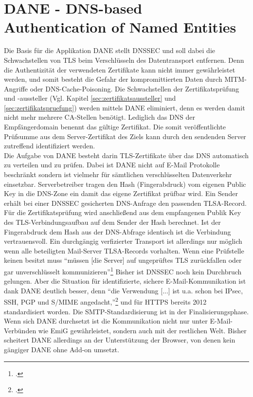 \section{DANE - DNS-based Authentication of Named Entities}
\label{sec:dane}
	Die Basis für die Applikation \ac{DANE} stellt \ac{DNSSEC} und soll dabei die Schwachstellen von \ac{TLS} beim Verschlüsseln des Datentransport entfernen. Denn die Authentizität der verwendeten Zertifikate kann nicht immer gewährleistet werden, und somit besteht die Gefahr der kompromittierten Daten durch \ac{MITM}-Angriffe oder \ac{DNS}-Cache-Poisoning.
	Die Schwachstellen der Zertifikatsprüfung und -aussteller (Vgl. Kapitel \ref{sec:zertifikatsaussteller} und \ref{sec:zertifikatspruefung}) werden mittels \ac{DANE} eliminiert, denn es werden damit nicht mehr mehrere CA-Stellen benötigt. Lediglich das DNS der Empfängerdomain benennt das gültige Zertifikat. Die somit  veröffentlichte Prüfsumme aus dem Server-Zertifikat des Ziels kann durch den sendenden Server zutreffend identifiziert werden.\medskip\\
	Die Aufgabe von \ac{DANE} besteht darin \ac{TLS}-Zertifikate über das \ac{DNS} automatisch zu verteilen und zu prüfen. Dabei ist \ac{DANE} nicht auf E-Mail Protokolle beschränkt sondern ist vielmehr für sämtlichen verschlüsselten Datenverkehr einsetzbar.
	Serverbetreiber tragen den Hash (Fingerabdruck) vom eigenen Public Key in die \ac{DNS}-Zone ein damit das eigene Zertifikat prüfbar wird. Ein Sender erhält bei einer \ac{DNSSEC} gesicherten \ac{DNS}-Anfrage den passenden \ac{TLSA}-Record. Für die Zertifikatsprüfung wird anschließend aus dem empfangenen Publik Key des \ac{TLS}-Verbindungsaufbau auf dem Sender der Hash berechnet. Ist der Fingerabdruck dem Hash aus der \ac{DNS}-Abfrage identisch ist die Verbindung vertrauensvoll.
	Ein durchgängig verfizierter Transport ist allerdings nur möglich wenn alle beteiligten Mail-Server \ac{TLSA}-Records vorhalten. Wenn eine Prüfstelle keinen besitzt muss ``müssen [die Server] auf ungeprüftes \ac{TLS} zurückfallen oder gar unverschlüsselt kommunizieren''\footcite[S. 197]{Koetter2014}
	Bisher ist \ac{DNSSEC} noch kein Durchbruch gelungen. Aber die Situation für identifizierte, sichere E-Mail-Kommunikation ist dank \ac{DANE} deutlich besser, denn ``die Verwendung [...] ist u.a. schon bei \ac{IPsec}, \ac{SSH}, \ac{PGP} und \ac{S/MIME} angedacht,''\footcite[S. 196]{Koetter2014} und für \ac{HTTPS} bereits 2012 standardisiert worden. Die \ac{SMTP}-Standardisierung ist in der Finalisierungsphase. Wenn sich \ac{DANE} durchsetzt ist die Kommunikation nicht nur unter E-Mail-Verbünden wie \ac{EmiG} gewährleistet, sondern auch mit der restlichen Welt. Bisher scheitert \ac{DANE} allerdings an der Unterstützung der Browser, von denen kein gängiger \ac{DANE} ohne Add-on umsetzt.
